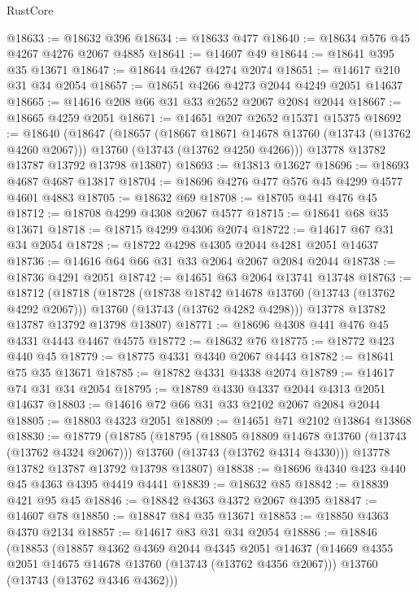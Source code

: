 \begin{lexlean}{RustCore}
\begin{coremodule}
@18633 := @18632 @396
@18634 := @18633 @477
@18640 := @18634 @576 @45 @4267 @4276 @2067 @4885
@18641 := @14607 @49
@18644 := @18641 @395 @35 @13671
@18647 := @18644 @4267 @4274 @2074
@18651 := @14617 @210 @31 @34 @2054
@18657 := @18651 @4266 @4273 @2044 @4249 @2051 @14637
@18665 := @14616 @208 @66 @31 @33 @2652 @2067 @2084 @2044
@18667 := @18665 @4259 @2051
@18671 := @14651 @207 @2652 @15371 @15375
@18692 := @18640
    (@18647
      (@18657
        (@18667 @18671 @14678 @13760 (@13743 (@13762 @4260 @2067)))
        @13760
        (@13743 (@13762 @4250 @4266)))
      @13778
      @13782
      @13787
      @13792
      @13798
      @13807)
@18693 := @13813 @13627
@18696 := @18693 @4687 @4687 @13817
@18704 := @18696 @4276 @477 @576 @45 @4299 @4577 @4601 @4883
@18705 := @18632 @69
@18708 := @18705 @441 @476 @45
@18712 := @18708 @4299 @4308 @2067 @4577
@18715 := @18641 @68 @35 @13671
@18718 := @18715 @4299 @4306 @2074
@18722 := @14617 @67 @31 @34 @2054
@18728 := @18722 @4298 @4305 @2044 @4281 @2051 @14637
@18736 := @14616 @64 @66 @31 @33 @2064 @2067 @2084 @2044
@18738 := @18736 @4291 @2051
@18742 := @14651 @63 @2064 @13741 @13748
@18763 := @18712
    (@18718
      (@18728
        (@18738 @18742 @14678 @13760 (@13743 (@13762 @4292 @2067)))
        @13760
        (@13743 (@13762 @4282 @4298)))
      @13778
      @13782
      @13787
      @13792
      @13798
      @13807)
@18771 := @18696 @4308 @441 @476 @45 @4331 @4443 @4467 @4575
@18772 := @18632 @76
@18775 := @18772 @423 @440 @45
@18779 := @18775 @4331 @4340 @2067 @4443
@18782 := @18641 @75 @35 @13671
@18785 := @18782 @4331 @4338 @2074
@18789 := @14617 @74 @31 @34 @2054
@18795 := @18789 @4330 @4337 @2044 @4313 @2051 @14637
@18803 := @14616 @72 @66 @31 @33 @2102 @2067 @2084 @2044
@18805 := @18803 @4323 @2051
@18809 := @14651 @71 @2102 @13864 @13868
@18830 := @18779
    (@18785
      (@18795
        (@18805 @18809 @14678 @13760 (@13743 (@13762 @4324 @2067)))
        @13760
        (@13743 (@13762 @4314 @4330)))
      @13778
      @13782
      @13787
      @13792
      @13798
      @13807)
@18838 := @18696 @4340 @423 @440 @45 @4363 @4395 @4419 @4441
@18839 := @18632 @85
@18842 := @18839 @421 @95 @45
@18846 := @18842 @4363 @4372 @2067 @4395
@18847 := @14607 @78
@18850 := @18847 @84 @35 @13671
@18853 := @18850 @4363 @4370 @2134
@18857 := @14617 @83 @31 @34 @2054
@18886 := @18846
    (@18853
      (@18857
        @4362
        @4369
        @2044
        @4345
        @2051
        @14637
        (@14669 @4355 @2051 @14675 @14678 @13760 (@13743 (@13762 @4356 @2067)))
        @13760
        (@13743 (@13762 @4346 @4362)))

\end{coremodule}
\end{lexlean}
